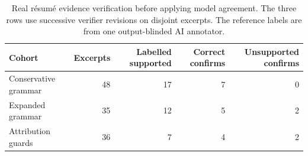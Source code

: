 \begin{table}[htbp]
\small
\centering
\caption[Evidence confirmations across résumé cohorts]{Real résumé evidence verification before applying model agreement. The three rows use successive verifier revisions on disjoint excerpts. The reference labels are from one output-blinded AI annotator.}
\label{tab:cv-evidence}
\begin{tabular}{@{}lrrrr@{}}
\toprule
Cohort & Excerpts & Labelled supported & Correct confirms & Unsupported confirms \\
\midrule
Conservative grammar & 48 & 17 & 7 & 0 \\
Expanded grammar & 35 & 12 & 5 & 2 \\
Attribution guards & 36 & 7 & 4 & 2 \\
\bottomrule
\end{tabular}
\end{table}
